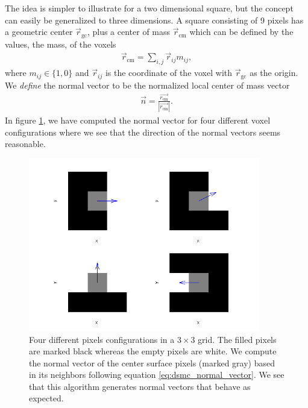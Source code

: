 The idea is simpler to illustrate for a two dimensional square, but the concept can easily be generalized to three dimensions. A square consisting of 9 pixels has a geometric center $\vec r_\text{gc}$, plus a center of mass $\vec r_\text{cm}$ which can be defined by the values, the mass, of the voxels
\begin{align}
	\vec r_\text{cm} = \sum_{i,j} \vec r_{ij}m_{ij},
\end{align}
where $m_{ij} \in \{1,0\}$ and $\vec r_{ij}$ is the coordinate of the voxel with $\vec r_\text{gc}$ as the origin. We \textit{define} the normal vector to be the normalized local center of mass vector
\begin{align}
	\label{eq:dsmc_normal_vector}
	\vec n = \frac{\vec{r_\text{cm}}}{|\vec{r_\text{cm}}|}.
\end{align}
In figure \ref{fig:dsmc_normal_vectors}, we have computed the normal vector for four different voxel configurations where we see that the direction of the normal vectors seems reasonable. 
\begin{figure}[htb]
\begin{center}
\includegraphics[width=0.9\textwidth, trim=0cm 0cm 0cm 0cm, clip]{DSMC/figures/normal_vectors.png}
\end{center}
\caption{Four different pixels configurations in a $3\times 3$ grid. The filled pixels are marked black whereas the empty pixels are white. We compute the normal vector of the center surface pixels (marked gray) based in its neighbors following equation \eqref{eq:dsmc_normal_vector}. We see that this algorithm generates normal vectors that behave as expected.}
\label{fig:dsmc_normal_vectors}
\end{figure}
